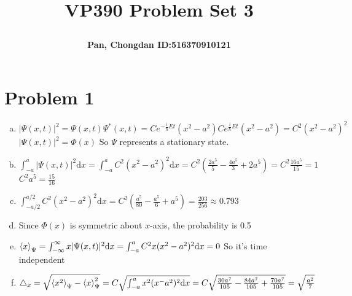 \documentclass[a4paper]{article}
\title{\Large \textbf{VP390 Problem Set 3}\\
\author{\textbf{Pan, Chongdan ID:516370910121}\\
}
}
\begin{document}
\maketitle
\section{Problem 1}
\begin{enumerate}[(a)]
    \item $|\Psi(x,t)|^2=\Psi(x,t)\Psi^*(x,t)=Ce^{-\frac{i}{\hbar}Et}(x^2-a^2)Ce^{\frac{i}{\hbar}Et}(x^2-a^2)=C^2(x^2-a^2)^2$
    \\ $|\Psi(x,t)|^2=\Phi(x)$ So $\Psi$ represents a stationary state.
    \item $\int_{-a}^a|\Psi(x,t)|^2\mathrm{d}x=\int_{-a}^a C^2(x^2-a^2)^2\mathrm{d}x=C^2(\frac{2a^5}{5}-\frac{4a^5}{3}+2a^5)=C^2\frac{16a^5}{15}=1$
    \\$C^2a^5=\frac{15}{16}$
    \item $\int_{-a/2}^{a/2} C^2(x^2-a^2)^2\mathrm{d}x=C^2(\frac{a^5}{80}-\frac{a^5}{6}+a^5)=\frac{203}{256}\approx0.793$
    \item Since $\Phi(x)$ is symmetric about $x$-axis, the probability is 0.5
    \item $\braket{x}_\Psi=\int_{-\infty}^\infty x|\Psi(x,t)|^2\mathrm{d}x=\int_{-a}^a C^2x(x^2-a^2)^2\mathrm{d}x=0$
    So it's time independent
    \item $\bigtriangleup_x=\sqrt{\braket{x^2}_\Psi-\braket{x}_\Psi^2}=C\sqrt{\int_{-a}^a x^2(x^-a^2)^2\mathrm{d}x}=C\sqrt{\frac{30a^7}{105}-\frac{84a^7}{105}+\frac{70a^7}{105}}=\sqrt{\frac{a^2}{7}}$
\end{enumerate}
\end{document}

